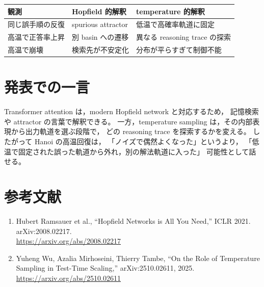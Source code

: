 \documentclass[a4paper,11pt]{ltjsarticle}
\theoremstyle{definition}
\theoremstyle{plain}
\theoremstyle{remark}
\begin{document}
\begin{center}
\begin{tabular}{lll}
\toprule
観測 & Hopfield 的解釈 & temperature 的解釈 \\
\midrule
同じ誤手順の反復 & spurious attractor & 低温で高確率軌道に固定 \\
高温で正答率上昇 & 別 basin への遷移 & 異なる reasoning trace の探索 \\
高温で崩壊 & 検索先が不安定化 & 分布が平らすぎて制御不能 \\
\bottomrule
\end{tabular}
\end{center}

\section*{発表での一言}

Transformer attention は，modern Hopfield network と対応するため，
記憶検索や attractor の言葉で解釈できる。
一方，temperature sampling は，その内部表現から出力軌道を選ぶ段階で，
どの reasoning trace を探索するかを変える。
したがって Hanoi の高温回復は，
「ノイズで偶然よくなった」というより，
「低温で固定された誤った軌道から外れ，別の解法軌道に入った」
可能性として話せる。

\section*{参考文献}

\begin{enumerate}[leftmargin=1.7em]
\item Hubert Ramsauer et al.,
``Hopfield Networks is All You Need,'' ICLR 2021. arXiv:2008.02217.\\
\url{https://arxiv.org/abs/2008.02217}
\item Yuheng Wu, Azalia Mirhoseini, Thierry Tambe,
``On the Role of Temperature Sampling in Test-Time Scaling,'' arXiv:2510.02611, 2025.\\
\url{https://arxiv.org/abs/2510.02611}
\end{enumerate}
\end{document}
